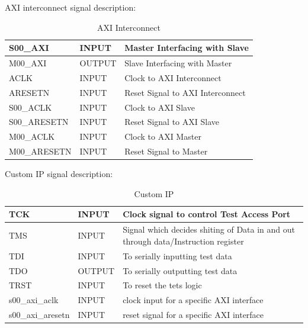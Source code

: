 \newpage
AXI interconnect signal description:
\begin{table}[H]
		\centering
		\begin{tabularx}{\textwidth}{|p{3cm}  |p{2cm} |X|}
			\hline
			S00\_AXI & INPUT & Master Interfacing with Slave \\
			\hline
			M00\_AXI & OUTPUT & Slave Interfacing with Master   \\
            \hline
			ACLK & INPUT & Clock to AXI Interconnect \\
			\hline
			ARESETN & INPUT & Reset Signal to AXI Interconnect \\
			\hline
			S00\_ACLK & INPUT & Clock to AXI Slave \\
			\hline
            S00\_ARESETN & INPUT & Reset Signal to AXI Slave \\
			\hline
            M00\_ACLK & INPUT & Clock to AXI Master \\
			\hline
            M00\_ARESETN & INPUT & Reset Signal to Master \\
			\hline
		\end{tabularx}
		\caption{AXI Interconnect}
	\end{table}

\vspace{6mm}
Custom IP signal description:
 \begin{table}[H]
		\centering
		\begin{tabularx}{\textwidth}{|p{3cm}  |p{3cm} |X|}
			\hline
			TCK & INPUT &  Clock signal to control Test Access Port\\
			\hline
			TMS & INPUT & Signal which decides shiting of Data in and out through data/Instruction register   \\
            \hline
			TDI & INPUT & To serially inputting test data\\
			\hline
               TDO & OUTPUT & To serially outputting test data\\
			\hline
			TRST & INPUT &  To reset the tets logic\\
			\hline
			s00\_axi\_aclk & INPUT & clock input for a specific AXI interface\\
			\hline
            s00\_axi\_aresetn & INPUT &  reset signal for a specific AXI interface\\
			\hline
		\end{tabularx}
		\caption{Custom IP}
	\end{table}
